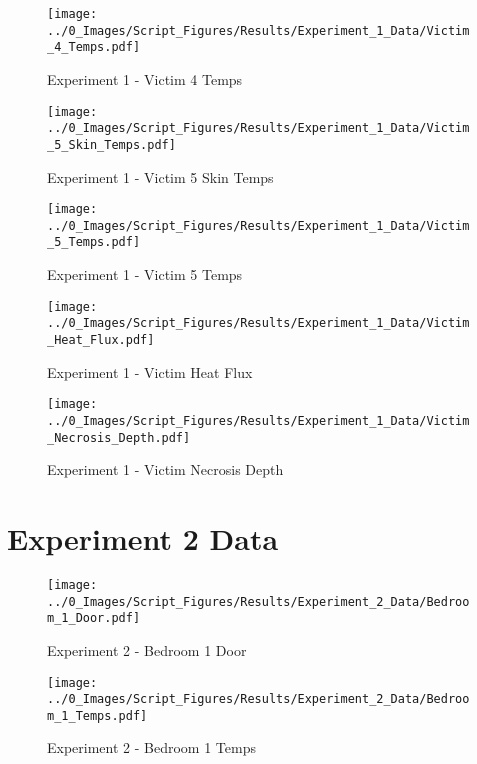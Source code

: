 	\begin{figure}[H]
		\centering
		\texttt{[image: ../0\_Images/Script\_Figures/Results/Experiment\_1\_Data/Victim\_4\_Temps.pdf]}
		\caption[]{Experiment 1 - Victim 4 Temps}
	\end{figure}
 
	\clearpage

	\begin{figure}[H]
		\centering
		\texttt{[image: ../0\_Images/Script\_Figures/Results/Experiment\_1\_Data/Victim\_5\_Skin\_Temps.pdf]}
		\caption[]{Experiment 1 - Victim 5 Skin Temps}
	\end{figure}
 

	\begin{figure}[H]
		\centering
		\texttt{[image: ../0\_Images/Script\_Figures/Results/Experiment\_1\_Data/Victim\_5\_Temps.pdf]}
		\caption[]{Experiment 1 - Victim 5 Temps}
	\end{figure}
 
	\clearpage

	\begin{figure}[H]
		\centering
		\texttt{[image: ../0\_Images/Script\_Figures/Results/Experiment\_1\_Data/Victim\_Heat\_Flux.pdf]}
		\caption[]{Experiment 1 - Victim Heat Flux}
	\end{figure}
 

	\begin{figure}[H]
		\centering
		\texttt{[image: ../0\_Images/Script\_Figures/Results/Experiment\_1\_Data/Victim\_Necrosis\_Depth.pdf]}
		\caption[]{Experiment 1 - Victim Necrosis Depth}
	\end{figure}
 
	\clearpage

\clearpage		\large
\section{Experiment 2 Data} \label{App:Exp2Results} 

	\begin{figure}[H]
		\centering
		\texttt{[image: ../0\_Images/Script\_Figures/Results/Experiment\_2\_Data/Bedroom\_1\_Door.pdf]}
		\caption[]{Experiment 2 - Bedroom 1 Door}
	\end{figure}
 

	\begin{figure}[H]
		\centering
		\texttt{[image: ../0\_Images/Script\_Figures/Results/Experiment\_2\_Data/Bedroom\_1\_Temps.pdf]}
		\caption[]{Experiment 2 - Bedroom 1 Temps}
	\end{figure}
 
